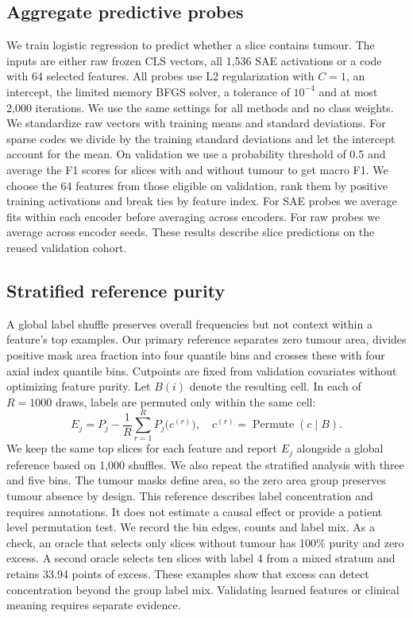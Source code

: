 \documentclass[letterpaper]{article}
\begin{document}
\subsection{Aggregate predictive probes}\label{sec:probes}
We train logistic regression to predict whether a slice contains tumour. The inputs are either raw frozen CLS vectors, all 1,536 SAE activations or a code with 64 selected features. All probes use L2 regularization with $C=1$, an intercept, the limited memory BFGS solver, a tolerance of $10^{-4}$ and at most 2,000 iterations. We use the same settings for all methods and no class weights. We standardize raw vectors with training means and standard deviations. For sparse codes we divide by the training standard deviations and let the intercept account for the mean. On validation we use a probability threshold of 0.5 and average the F1 scores for slices with and without tumour to get macro F1. We choose the 64 features from those eligible on validation, rank them by positive training activations and break ties by feature index. For SAE probes we average fits within each encoder before averaging across encoders. For raw probes we average across encoder seeds. These results describe slice predictions on the reused validation cohort.

\subsection{Stratified reference purity}
A global label shuffle preserves overall frequencies but not context within a feature's top examples. Our primary reference separates zero tumour area, divides positive mask area fraction into four quantile bins and crosses these with four axial index quantile bins. Cutpoints are fixed from validation covariates without optimizing feature purity. Let $B(i)$ denote the resulting cell. In each of $R=1000$ draws, labels are permuted only within the same cell:
\begin{equation}
 E_j=P_j-\frac1R\sum_{r=1}^{R}P_j\bigl(c^{(r)}\bigr),\quad
 c^{(r)}=\operatorname{Permute}(c\mid B).
\label{eq:stratified}
\end{equation}
We keep the same top slices for each feature and report $E_j$ alongside a global reference based on 1,000 shuffles. We also repeat the stratified analysis with three and five bins. The tumour masks define area, so the zero area group preserves tumour absence by design. This reference describes label concentration and requires annotations. It does not estimate a causal effect or provide a patient level permutation test. We record the bin edges, counts and label mix. As a check, an oracle that selects only slices without tumour has 100\% purity and zero excess. A second oracle selects ten slices with label 4 from a mixed stratum and retains 33.94 points of excess. These examples show that excess can detect concentration beyond the group label mix. Validating learned features or clinical meaning requires separate evidence.
\end{document}

